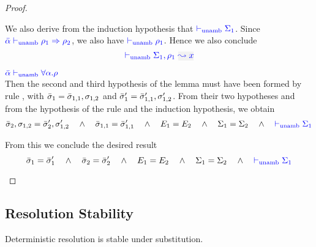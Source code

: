 \begin{proof}
\begin{description}
  We also derive from the induction hypothesis that ${\color{blue}  \vdash_{\mathrm{unamb}} \Sigma_1}$. 
  Since ${\color{blue} \bar{\alpha} \vdash_{\mathrm{unamb}} \rho_1 \Rightarrow \rho_2}$, we also have ${\color{blue}  \vdash_{\mathrm{unamb}} \rho_1}$.
  Hence we also conclude
\begin{equation*}
  \unambig{}{\Sigma_1,\ie{\rulet_1}{x}}
\end{equation*}
\item[\fbox{\rref{UA-TAbs}}]\quad${\color{blue} \bar{\alpha} \vdash_{\mathrm{unamb}} \forall \alpha.\rho}$\\

Then the second and third hypothesis of the lemma must have been formed by rule ,
  with $\bar{\sigma}_1 = \bar{\sigma}_{1,1},\sigma_{1,2}$ and $\bar{\sigma}_1' = \bar{\sigma}_{1,1}',\sigma_{1,2}'$.
  From their two hypotheses and from the hypothesis of the rule and the induction hypothesis, we obtain
\begin{equation*}
  \bar{\sigma}_2,\sigma_{1,2} = \bar{\sigma}_2',\sigma_{1,2}' 
  \quad\wedge\quad
  \bar{\sigma}_{1,1} = \bar{\sigma}_{1,1}'
  \quad\wedge\quad
  E_1 = E_2
  \quad\wedge\quad
  \Sigma_1 = \Sigma_2
  \quad\wedge\quad
  {\color{blue}  \vdash_{\mathrm{unamb}}\Sigma_1}
\end{equation*}
  
  From this we conclude the desired result 
\begin{equation*}
  \bar{\sigma}_1 = \bar{\sigma}_1' \quad\wedge\quad \bar{\sigma}_2 = \bar{\sigma}_2'
  \quad\wedge\quad
  E_1 = E_2
  \quad\wedge\quad
  \Sigma_1 = \Sigma_2
  \quad\wedge\quad
  {\color{blue}  \vdash_{\mathrm{unamb}}\Sigma_1}
\end{equation*}
\end{description}
\end{proof}

\subsection{Resolution Stability}\label{proof:coherence}

Deterministic resolution is stable under substitution.

